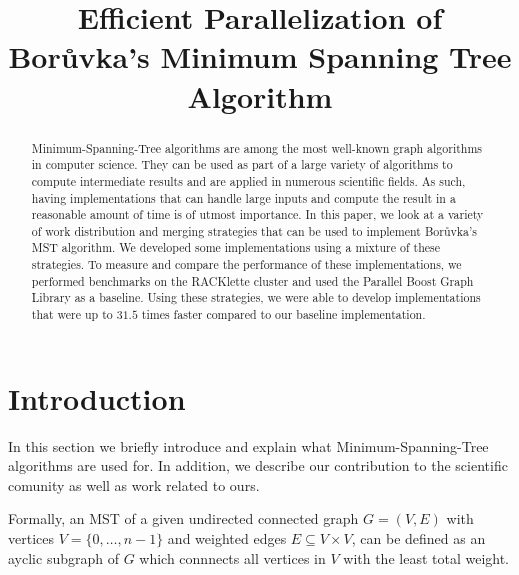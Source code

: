 \documentclass[letterpaper]{article}
\title{Efficient Parallelization of Bor\r{u}vka's Minimum Spanning Tree Algorithm}
\begin{document}
\maketitle

\begin{abstract}
Minimum-Spanning-Tree algorithms are among the most well-known graph algorithms in computer science. They can be used as
part of a large variety of algorithms to compute intermediate results and are applied in numerous scientific fields. As
such, having implementations that can handle large inputs and compute the result in a reasonable amount of time is of
utmost importance. In this paper, we look at a variety of work distribution and merging strategies that can be used to
implement Bor\r{u}vka's MST algorithm. We developed some implementations using a mixture of these strategies. To measure
and compare the performance of these implementations, we performed benchmarks on the RACKlette cluster and used the
Parallel Boost Graph Library as a baseline. Using these strategies, we were able to develop implementations that were up
to $31.5$ times faster compared to our baseline implementation.
\end{abstract}

\section{Introduction}
\label{sec:intro}
In this section we briefly introduce and explain what Minimum-Spanning-Tree algorithms are used for. In addition, we
describe our contribution to the scientific comunity as well as work related to ours.

Formally, an MST of a given undirected connected graph $G = (V, E)$ with vertices $V = \{ 0, \dotsc, n - 1 \}$ and
weighted edges $E \subseteq V \times V$, can be defined as an ayclic subgraph of $G$ which connnects all vertices in
$V$ with the least total weight.
\end{document}
